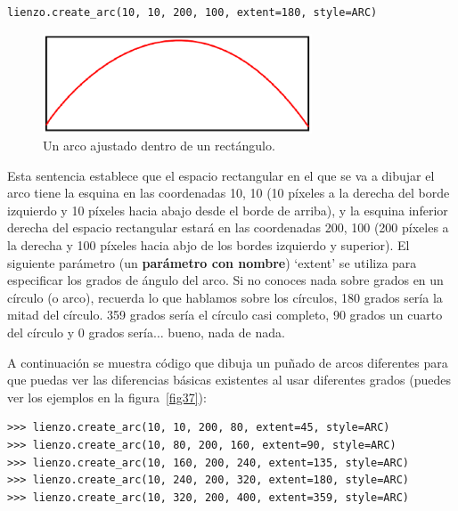 \begin{listing}
\begin{verbatim}
lienzo.create_arc(10, 10, 200, 100, extent=180, style=ARC)
\end{verbatim}
\end{listing}

\begin{figure}
\begin{center}
\includegraphics[width=80mm]{figure36.eps}
\end{center}
\caption{Un arco ajustado dentro de un rectángulo.}\label{fig36}
\end{figure}

Esta sentencia establece que el espacio rectangular en el que se va a dibujar el arco tiene la esquina en las coordenadas 10, 10 (10 píxeles a la derecha del borde izquierdo y 10 píxeles hacia abajo desde el borde de arriba), y la esquina inferior derecha del espacio rectangular estará en las coordenadas 200, 100 (200 píxeles a la derecha y 100 píxeles hacia abjo de los bordes izquierdo y superior).  El siguiente parámetro (un \textbf{parámetro con nombre}) `extent' se utiliza para especificar los grados de ángulo del arco.  Si no conoces nada sobre grados en un círculo (o arco), recuerda lo que hablamos sobre los círculos, 180 grados sería la mitad del círculo.  359 grados sería el círculo casi completo, 90 grados un cuarto del círculo y 0 grados sería$\ldots$ bueno, nada de nada. 

A continuación se muestra código que dibuja un puñado de arcos diferentes para que puedas ver las diferencias básicas existentes al usar diferentes grados (puedes ver los ejemplos en la figura~\ref{fig37}):

\begin{listing}
\begin{verbatim}
>>> lienzo.create_arc(10, 10, 200, 80, extent=45, style=ARC)
>>> lienzo.create_arc(10, 80, 200, 160, extent=90, style=ARC)
>>> lienzo.create_arc(10, 160, 200, 240, extent=135, style=ARC)
>>> lienzo.create_arc(10, 240, 200, 320, extent=180, style=ARC)
>>> lienzo.create_arc(10, 320, 200, 400, extent=359, style=ARC)
\end{verbatim}
\end{listing}

